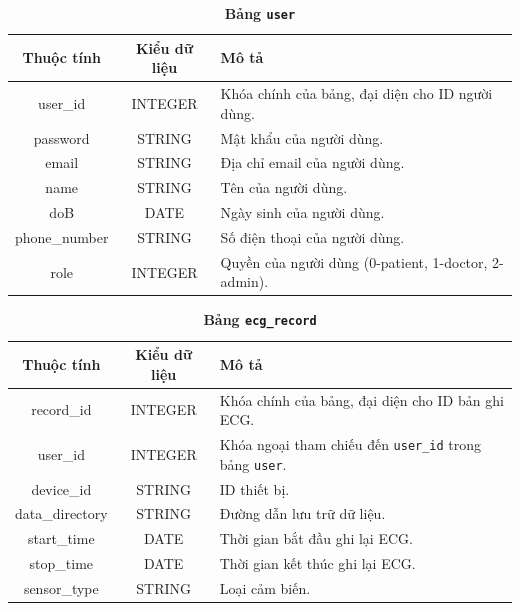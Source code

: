 \begin{table}[H]
  \caption{\bfseries \fontsize{12pt}{0pt}\selectfont Bảng \texttt{user}}
  \centering
  \begin{tabularx}{0.9\textwidth}{|c|c|X|}
    \hline
    \textbf{Thuộc tính} & \textbf{Kiểu dữ liệu} & \textbf{Mô tả} \\
    \hline
    user\_id & INTEGER & Khóa chính của bảng, đại diện cho ID người dùng. \\
    \hline
    password & STRING & Mật khẩu của người dùng. \\
    \hline
    email & STRING & Địa chỉ email của người dùng. \\
    \hline
    name & STRING & Tên của người dùng. \\
    \hline
    doB & DATE & Ngày sinh của người dùng. \\
    \hline
    phone\_number & STRING & Số điện thoại của người dùng. \\
    \hline
    role & INTEGER & Quyền của người dùng (0-patient, 1-doctor, 2-admin). \\
    \hline
  \end{tabularx}
\end{table}

\begin{table}[H]
  \caption{\bfseries \fontsize{12pt}{0pt}\selectfont Bảng \texttt{ecg\_record}}
  \centering
  \begin{tabularx}{0.9\textwidth}{|c|c|X|}
    \hline
    \textbf{Thuộc tính} & \textbf{Kiểu dữ liệu} & \textbf{Mô tả} \\
    \hline
    record\_id & INTEGER & Khóa chính của bảng, đại diện cho ID bản ghi ECG. \\
    \hline
    user\_id & INTEGER & Khóa ngoại tham chiếu đến \texttt{user\_id} trong bảng \texttt{user}. \\
    \hline
    device\_id & STRING & ID thiết bị. \\
    \hline
    data\_directory & STRING & Đường dẫn lưu trữ dữ liệu. \\
    \hline
    start\_time & DATE & Thời gian bắt đầu ghi lại ECG. \\
    \hline
    stop\_time & DATE & Thời gian kết thúc ghi lại ECG. \\
    \hline
    sensor\_type & STRING & Loại cảm biến. \\
    \hline
  \end{tabularx}
\end{table}

